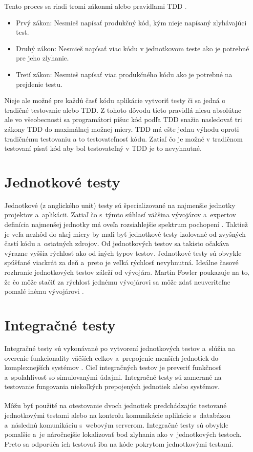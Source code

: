\documentclass[
  digital, %
  table,   %
oneside,
  nolof,     %
  nolot,     %
]{fithesis3}
\begin{document}
Tento proces sa riadi tromi zákonmi alebo pravidlami TDD \cite{cleanCode}.
\begin{itemize}
	\item Prvý zákon: Nesmieš napísať produkčný kód, kým nieje napísaný zlyhávajúci test.
	\item Druhý zákon: Nesmieš napísať viac kódu v jednotkovom teste ako je potrebné pre jeho zlyhanie.
	\item Tretí zákon: Nesmieš napísať viac produkčného kódu ako je potrebné na prejdenie testu. 
\end{itemize} 
Nieje ale možné pre každú časť kódu aplikácie vytvoriť testy či sa jedná o tradičné testovanie alebo TDD. Z tohoto dôvodu tieto pravidlá niesu absolútne ale vo všeobecnosti sa programátori píšuc kód podľa TDD snažia nasledovať tri zákony TDD do maximálnej možnej miery.
TDD má ešte jednu výhodu oproti tradičnému testovaniu a to testovateľnosť kódu. Zatiaľ čo je možné v tradičnom testovaní písať kód aby bol testovateľný v TDD je to nevyhnutné. 

\section{Jednotkové testy}
Jednotkové (z anglického unit) testy sú špecializované na najmenšie jednotky projektov a~aplikácii. Zatiaľ čo s~týmto súhlasí väčšina vývojárov a~expertov definícia najmenšej jednotky má oveľa rozsiahlejšie spektrum pochopení \cite{codeMaintability}\cite{effectiveSoftwareTesting}. Taktiež je veľa nezhôd do akej miery by mali byť jednotkové testy izolované od zvyšných častí kódu a~ostatných zdrojov. Od jednotkových testov sa takisto očakáva výrazne vyššia rýchlosť ako od iných typov testov. Jednotkové testy sú obvykle spúšťané viackrát za deň a~preto je veľká rýchlosť nevyhnutná. Ideálne časové rozhranie jednotkových testov záleží od vývojára. Martin Fowler poukazuje na to, že čo môže stačiť za rýchlosť jednému vývojárovi sa môže zdať neuveriteľne pomalé inému vývojárovi \cite{unitTest}.
\section{Integračné testy}
Integračné testy sú vykonávané po vytvorení jednotkových testov a~slúžia na overenie funkcionality väčších celkov a~prepojenie menších jednotiek do komplexnejších systémov \cite{testSeparation}. Cieľ integračných testov je preveriť funkčnosť a~spoľahlivosť so simulovanými údajmi. Integračné testy sú zamerané na testovanie fungovania niekoľkých prepojených jednotiek alebo systémov.\paragraph{}
Môžu byť použité na otestovanie dvoch jednotiek predchádzajúc testované jednotkovými testami alebo na kontrolu komunikácie aplikácie s~databázou a~následnú komunikáciu s~webovým serverom. Integračné testy sú obvykle pomalšie a~je náročnejšie lokalizovať bod zlyhania ako v~jednotkových  testoch. Preto sa odporúča ich testovať iba na kóde pokrytom jednotkovými testami.
\end{document}
